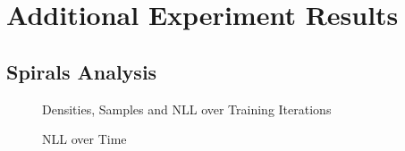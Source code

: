 \chapter{Additional Experiment Results}

\section{Spirals Analysis}
\label{sec:app_spirals}

\begin{figure}[H]
    \centering
    \caption{Densities, Samples and NLL over Training Iterations}
\end{figure}

\begin{figure}[H]
    \centering
    \caption{NLL over Time}
\end{figure}

